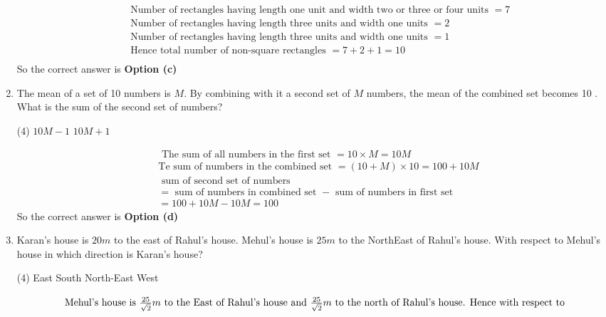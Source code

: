 \begin{enumerate}
\begin{tasks}
\end{tasks}
\begin{answer}
	\begin{align*}
&\text{ Number of rectangles having length one unit and width two or three or four units $=7$}\\
&\text{	Number of rectangles having length three units and width one units $=2$}\\
&\text{	Number of rectangles having length three units and width one units $=1$}\\
&\text{	Hence total number of non-square rectangles $=7+2+1=10$}\\
	\end{align*}
	So the correct answer is \textbf{Option (c)}
\end{answer}
\item  The mean of a set of 10 numbers is $M$. By combining with it a second set of $M$ numbers, the mean of the combined set becomes 10 . What is the sum of the second set of numbers?
 \begin{tasks}(4)
	\task[\textbf{a.}]$10 M-1$
	\task[\textbf{b.}]$10 M+1$
\end{tasks}
\begin{answer}
	\begin{align*}
&\text{ The sum of all numbers in the first set }=10 \times M=10 M\\
	&\text{Te sum of numbers in the combined set }=(10+M) \times 10=100+10 M\\
	&\text{ sum of second set of numbers}\\
	&\text{$=$ sum of numbers in combined set $-$ sum of numbers in first set }\\
	&=100+10 M-10 M=100
	\end{align*}
		So the correct answer is \textbf{Option (d)}
\end{answer}
\item Karan's house is $20 m$ to the east of Rahul's house. Mehul's house is $25 m$ to the NorthEast of Rahul's house. With respect to Mehul's house in which direction is Karan's house?
 \begin{tasks}(4)
	\task[\textbf{a.}]East
	\task[\textbf{b.}] South
	\task[\textbf{c.}]North-East
	\task[\textbf{d.}]  West
\end{tasks}
\begin{answer}
	\begin{align*}
	\intertext{ Mehul's house is $\frac{25}{\sqrt{2}} m$ to the East of Rahul's house and $\frac{25}{\sqrt{2}} m$ to the north of Rahul's house. Hence with respect to
}
\end{align*}
\end{answer}
\end{enumerate}
